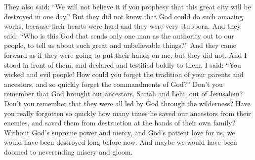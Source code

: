 They also said: ``We will not believe it if you prophesy that this great city will be destroyed in one day.''
\bverse \iffalse Now they knew not that God could do such marvelous works, for they were a hard-hearted and a stiffnecked people. \fi
But they did not know that God could do such amazing works, because their hearts were hard and they were very stubborn.
\bverse \iffalse And they said: Who is God, that sendeth no more authority than one man among this people, to declare unto them the truth of such great and marvelous things? \fi
And they said: ``Who is this God that sends only one man as the authority out to our people, to tell us about such great and unbelievable things?''
\bverse \iffalse And they stood forth to lay their hands on me; but behold, they did not. And I stood with boldness to declare unto them, yea, I did boldly testify unto them, saying: \fi
And they came forward as if they were going to put their hands on me, but they did not. And I stood in front of them, and declared and testified boldly to them. I said:
\bverse \iffalse Behold, O ye wicked and perverse generation, how have ye forgotten the tradition of your fathers; yea, how soon ye have forgotten the commandments of God. \fi
``You wicked and evil people! How could you forget the tradition of your parents and ancestors, and so quickly forget the commandments of God?''
\bverse \iffalse Do ye not remember that our father, Lehi, was brought out of Jerusalem by the hand of God? Do ye not remember that they were all led by him through the wilderness? \fi
Don't you remember that God brought our ancestors, Sariah and Lehi, out of Jerusalem? Don't you remember that they were all led by God through the wilderness?
\bverse \iffalse And have ye forgotten so soon how many times he delivered our fathers out of the hands of their enemies, and preserved them from being destroyed, even by the hands of their own brethren? \fi
Have you really forgotten so quickly how many times he saved our ancestors from their enemies, and saved them from destruction at the hands of their own family?
\bverse \iffalse Yea, and if it had not been for his matchless power, and his mercy, and his long-suffering towards us, we should unavoidably have been cut off from the face of the earth long before this period of time, and perhaps been consigned to a state of endless misery and woe. \fi
Without God's supreme power and mercy, and God's patient love for us, we would have been destroyed long before now. And maybe we would have been doomed to neverending misery and gloom.
